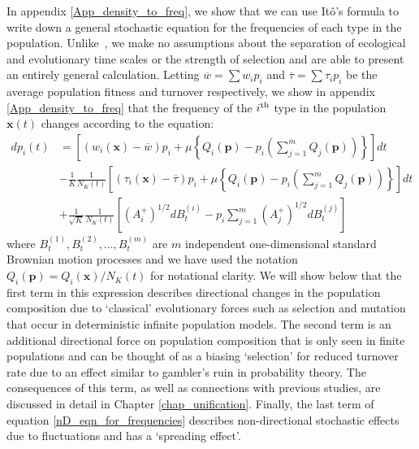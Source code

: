 In appendix \ref{App_density_to_freq}, we show that we can use It\^{o}'s formula to write  down a general stochastic equation for the frequencies of each type in the population. Unlike~\citep{mcleod_social_2019}, we make no assumptions about the separation of ecological and evolutionary time scales or the strength of selection and are able to present an entirely general calculation.  Letting $\overline{w} = \sum w_ip_i$ and $\overline{\tau} = \sum \tau_i p_i$ be the average population fitness and turnover respectively, we show in appendix \ref{App_density_to_freq} that the frequency of the $i\textsuperscript{th}$ type in the population $\mathbf{x}(t)$ changes according to the equation:
\begin{equation}
\label{nD_eqn_for_frequencies}
\begin{aligned}
dp_i(t) &= \left[(w_i(\mathbf{x}) - \overline{w})p_i + \mu\left\{Q_i(\mathbf{p}) - p_i\left(\sum\limits_{j=1}^{m}Q_j(\mathbf{p})\right)\right\}\right]dt\\
&- \frac{1}{K}\frac{1}{N_{K}(t)}\left[(\tau_i(\mathbf{x}) - \overline{\tau})p_i + \mu\left\{Q_i(\mathbf{p}) - p_i\left(\sum\limits_{j=1}^{m}Q_j(\mathbf{p})\right)\right\}\right]dt\\
&+ \frac{1}{\sqrt{K}}\frac{1}{N_{K}(t)}\left[\left(A^{+}_{i}\right)^{1/2}dB^{(i)}_t - p_i\sum\limits_{j=1}^{m}\left(A^{+}_{j}\right)^{1/2}dB^{(j)}_t\right]
\end{aligned}
\end{equation}
where $B^{(1)}_t,B^{(2)}_t, \ldots, B^{(m)}_t$ are $m$ independent one-dimensional standard Brownian motion processes and we have used the notation $Q_i(\mathbf{p}) = Q_i(\mathbf{x})/N_K(t)$ for notational clarity. We will show below that the first term in this expression describes directional changes in the population composition due to `classical' evolutionary forces such as selection and mutation that occur in deterministic infinite population models. The second term is an additional directional force on population composition that is only seen in finite populations and can be thought of as a biasing `selection' for reduced turnover rate due to an effect similar to gambler's ruin in probability theory. The consequences of this term, as well as connections with previous studies, are discussed in detail in Chapter \ref{chap_unification}. Finally, the last term of equation \eqref{nD_eqn_for_frequencies} describes non-directional stochastic effects due to fluctuations and has a `spreading effect'.

